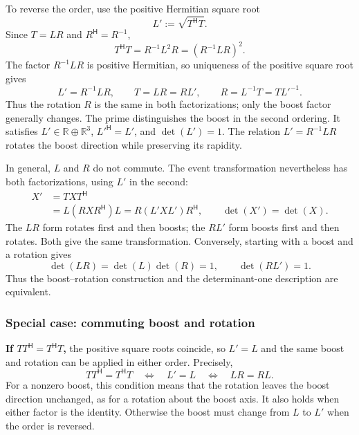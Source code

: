 \documentclass[11pt]{article}
\newcommand{\pv}[1]{{#1}}
\newcommand{\pL}{\pv{L}}
\newcommand{\pR}{\pv{R}}
\newcommand{\pT}{\pv{T}}
\newcommand{\pX}{\pv{X}}
\numberwithin{equation}{section}
\newcommand{\R}{\mathbb{R}}
\begin{document}
To reverse the order, use the positive Hermitian square root
\[
 \pL':=\sqrt{\pT^{\mathsf H}\pT}.
\]
Since $\pT=\pL\pR$ and $\pR^{\mathsf H}=\pR^{-1}$,
\[
 \pT^{\mathsf H}\pT
 =\pR^{-1}\pL^2\pR
 =(\pR^{-1}\pL\pR)^2.
\]
The factor $\pR^{-1}\pL\pR$ is positive Hermitian, so uniqueness of
the positive square root gives
\begin{equation}
 \boxed{\pL'=\pR^{-1}\pL\pR,\qquad
 \pT=\pL\pR=\pR\pL',\qquad
 \pR=\pL^{-1}\pT=\pT\pL'^{-1}.}
 \label{eq:boost-rotation-factorizations}
\end{equation}
Thus the rotation $\pR$ is the same in both factorizations; only the
boost factor generally changes. The prime distinguishes the boost in
the second ordering. It satisfies $\pL'\in\R\oplus\R^3$,
$\pL'^{\mathsf H}=\pL'$, and $\det(\pL')=1$.
The relation $\pL'=\pR^{-1}\pL\pR$ rotates the boost direction while
preserving its rapidity.

In general, $\pL$ and $\pR$ do not commute. The event transformation
nevertheless has both factorizations, using $\pL'$ in the second:
\begin{align*}
 \pX'&=\pT\pX\pT^{\mathsf H}\\
 &=\pL(\pR\pX\pR^{\mathsf H})\pL
 =\pR(\pL'\pX\pL')\pR^{\mathsf H},\qquad
 \det(\pX')=\det(\pX).
\end{align*}
The $\pL\pR$ form rotates first and then boosts; the $\pR\pL'$ form
boosts first and then rotates. Both give the same transformation.
Conversely, starting with a boost and a rotation gives
\[
 \det(\pL\pR)=\det(\pL)\det(\pR)=1,\qquad
 \det(\pR\pL')=1.
\]
Thus the boost--rotation construction and the determinant-one
description are equivalent.

\subsubsection{Special case: commuting boost and rotation}
\label{sec:commuting-boost-rotation}

\textbf{If $\pT\pT^{\mathsf H}=\pT^{\mathsf H}\pT$,} the positive
square roots coincide, so $\pL'=\pL$ and the same boost and rotation
can be applied in either order. Precisely,
\[
 \boxed{\pT\pT^{\mathsf H}=\pT^{\mathsf H}\pT
 \quad\Longleftrightarrow\quad \pL'=\pL
 \quad\Longleftrightarrow\quad \pL\pR=\pR\pL.}
\]
For a nonzero boost, this condition means that the rotation leaves
the boost direction unchanged, as for a rotation about the boost axis.
It also holds when either factor is the identity. Otherwise the boost
must change from $\pL$ to $\pL'$ when the order is reversed.
\end{document}

